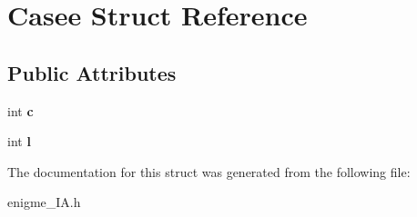 \hypertarget{structCasee}{}\section{Casee Struct Reference}
\label{structCasee}
\subsection*{Public Attributes}
\begin{DoxyCompactItemize}
\item 
int {\bfseries c}\hypertarget{structCasee_a56cad37789ae008271696d7db164d351}{}\label{structCasee_a56cad37789ae008271696d7db164d351}

\item 
int {\bfseries l}\hypertarget{structCasee_a5edb04b2a580f84fb2513b9049ce7067}{}\label{structCasee_a5edb04b2a580f84fb2513b9049ce7067}

\end{DoxyCompactItemize}


The documentation for this struct was generated from the following file\+:\begin{DoxyCompactItemize}
\item 
enigme\+\_\+\+I\+A.\+h\end{DoxyCompactItemize}

